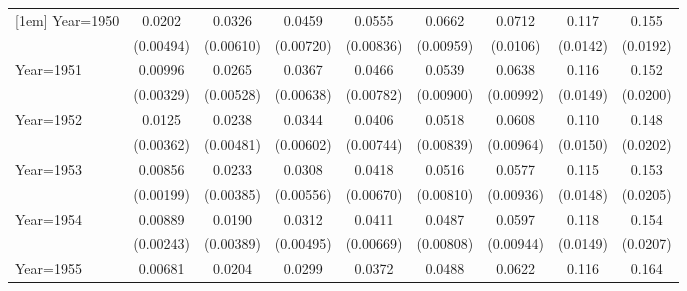 \begin{table}[htbp]
\begin{tabular}{l*{8}{c}}
[1em]
Year=1950           &      0.0202\sym{***}&      0.0326\sym{***}&      0.0459\sym{***}&      0.0555\sym{***}&      0.0662\sym{***}&      0.0712\sym{***}&       0.117\sym{***}&       0.155\sym{***}\\
                    &   (0.00494)         &   (0.00610)         &   (0.00720)         &   (0.00836)         &   (0.00959)         &    (0.0106)         &    (0.0142)         &    (0.0192)         \\
[1em]
Year=1951           &     0.00996\sym{***}&      0.0265\sym{***}&      0.0367\sym{***}&      0.0466\sym{***}&      0.0539\sym{***}&      0.0638\sym{***}&       0.116\sym{***}&       0.152\sym{***}\\
                    &   (0.00329)         &   (0.00528)         &   (0.00638)         &   (0.00782)         &   (0.00900)         &   (0.00992)         &    (0.0149)         &    (0.0200)         \\
[1em]
Year=1952           &      0.0125\sym{***}&      0.0238\sym{***}&      0.0344\sym{***}&      0.0406\sym{***}&      0.0518\sym{***}&      0.0608\sym{***}&       0.110\sym{***}&       0.148\sym{***}\\
                    &   (0.00362)         &   (0.00481)         &   (0.00602)         &   (0.00744)         &   (0.00839)         &   (0.00964)         &    (0.0150)         &    (0.0202)         \\
[1em]
Year=1953           &     0.00856\sym{***}&      0.0233\sym{***}&      0.0308\sym{***}&      0.0418\sym{***}&      0.0516\sym{***}&      0.0577\sym{***}&       0.115\sym{***}&       0.153\sym{***}\\
                    &   (0.00199)         &   (0.00385)         &   (0.00556)         &   (0.00670)         &   (0.00810)         &   (0.00936)         &    (0.0148)         &    (0.0205)         \\
[1em]
Year=1954           &     0.00889\sym{***}&      0.0190\sym{***}&      0.0312\sym{***}&      0.0411\sym{***}&      0.0487\sym{***}&      0.0597\sym{***}&       0.118\sym{***}&       0.154\sym{***}\\
                    &   (0.00243)         &   (0.00389)         &   (0.00495)         &   (0.00669)         &   (0.00808)         &   (0.00944)         &    (0.0149)         &    (0.0207)         \\
[1em]
Year=1955           &     0.00681\sym{***}&      0.0204\sym{***}&      0.0299\sym{***}&      0.0372\sym{***}&      0.0488\sym{***}&      0.0622\sym{***}&       0.116\sym{***}&       0.164\sym{***}\\

\end{tabular}
\end{table}

